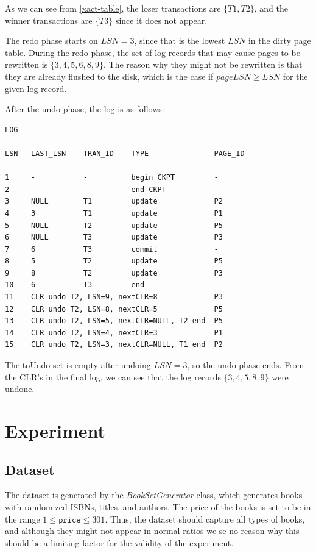 \documentclass[11pt,a4paper]{article}
\begin{document}
As we can see from \autoref{xact-table}, the loser transactions are
$\{T1,T2\}$, and the winner transactions are $\{T3\}$ since it does not appear.

The redo phase starts on $LSN = 3$, since that is the lowest $LSN$ in the dirty
page table. During the redo-phase, the set of log records that may cause pages
to be rewritten is $\{3,4,5,6,8,9\}$. The reason why they might not be
rewritten is that they are already flushed to the disk, which is the case if
$pageLSN \geq LSN$ for the given log record.

After the undo phase, the log is as follows:

\begin{verbatim}
LOG

LSN   LAST_LSN    TRAN_ID    TYPE               PAGE_ID
---   --------    -------    ----               -------
1     -           -          begin CKPT         -
2     -           -          end CKPT           -
3     NULL        T1         update             P2
4     3           T1         update             P1
5     NULL        T2         update             P5
6     NULL        T3         update             P3
7     6           T3         commit             -
8     5           T2         update             P5
9     8           T2         update             P3
10    6           T3         end                -
11    CLR undo T2, LSN=9, nextCLR=8             P3
12    CLR undo T2, LSN=8, nextCLR=5             P5
13    CLR undo T2, LSN=5, nextCLR=NULL, T2 end  P5
14    CLR undo T2, LSN=4, nextCLR=3             P1
15    CLR undo T2, LSN=3, nextCLR=NULL, T1 end  P2
\end{verbatim}

The toUndo set is empty after undoing $LSN = 3$, so the undo phase ends. From
the CLR's in the final log, we can see that the log records $\{3,4,5,8,9\}$
were undone.

\section*{Experiment}
\subsection*{Dataset}
The dataset is generated by the {\it BookSetGenerator} class, which generates
books with randomized ISBNs, titles, and authors. The price of the books is set
to be in the range $1 \leq \mathtt{price} \leq 301$. Thus, the dataset should
capture all types of books, and although they might not appear in normal ratios
we se no reason why this should be a limiting factor for the validity of the
experiment.
\end{document}
